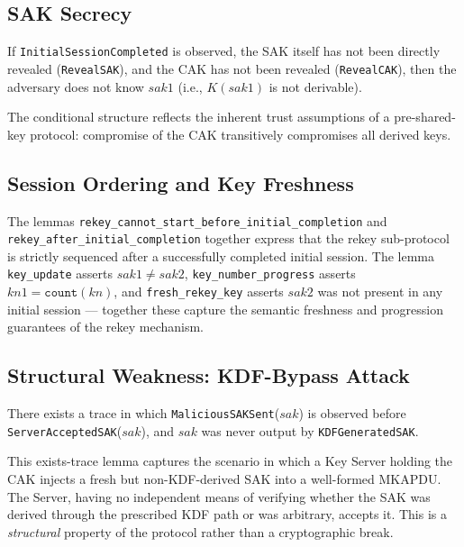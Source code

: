 \subsection{SAK Secrecy}

\begin{definition}
If \texttt{InitialSessionCompleted} is observed, the SAK itself has not been directly revealed (\texttt{RevealSAK}), and the CAK has not been revealed (\texttt{RevealCAK}), then the adversary does not know $sak1$ (i.e., $K(sak1)$ is not derivable).
\end{definition}

The conditional structure reflects the inherent trust assumptions of a pre-shared-key protocol: compromise of the CAK transitively compromises all derived keys.

\subsection{Session Ordering and Key Freshness}

The lemmas \texttt{rekey\_cannot\_start\_}\allowbreak\texttt{before\_initial\_}\allowbreak\texttt{completion} and \texttt{rekey\_after\_}\allowbreak\texttt{initial\_completion} together express that the rekey sub-protocol is strictly sequenced after a successfully completed initial session. The lemma \texttt{key\_update} asserts $sak1 \neq sak2$, \texttt{key\_number\_progress} asserts $kn1 = \mathtt{count}(kn)$, and \texttt{fresh\_rekey\_key} asserts $sak2$ was not present in any initial session --- together these capture the semantic freshness and progression guarantees of the rekey mechanism.

\subsection{Structural Weakness: KDF-Bypass Attack}

\begin{definition}
There exists a trace in which \texttt{MaliciousSAKSent}($sak$) is observed before \texttt{ServerAcceptedSAK}($sak$), and $sak$ was never output by \texttt{KDFGeneratedSAK}.
\end{definition}

This exists-trace lemma captures the scenario in which a Key Server holding the CAK injects a fresh but non-KDF-derived SAK into a well-formed MKAPDU. The Server, having no independent means of verifying whether the SAK was derived through the prescribed KDF path or was arbitrary, accepts it. This is a \emph{structural} property of the protocol rather than a cryptographic break.
